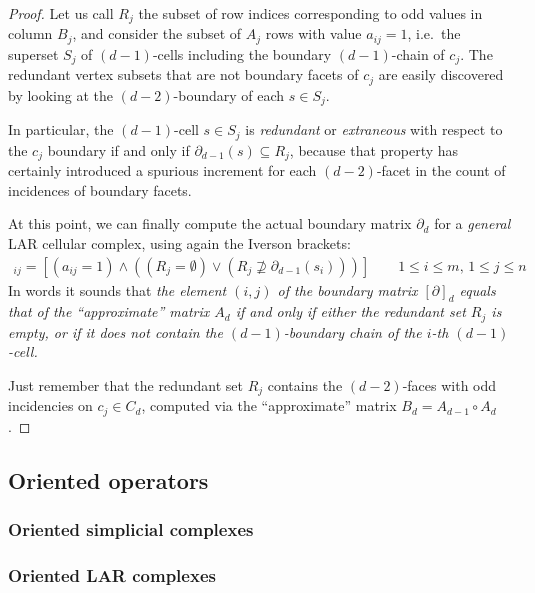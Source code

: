\documentclass[11pt,oneside]{article}    %
\begin{document}
\begin{proof}
Let us call $R_j$ the subset of row indices corresponding to odd values in column $B_j$, and consider the subset of $A_j$ rows with value $a_{ij}=1$, i.e.~the superset $S_j$ of $(d-1)$-cells including the boundary $(d-1)$-chain of $c_j$. The redundant vertex subsets that are not boundary facets of $c_j$  are easily discovered by looking at the $(d-2)$-boundary of each $s\in S_j$.

In particular, the $(d-1)$-cell $s\in S_j$ is \emph{redundant} or \emph{extraneous} with respect to the $c_j$ boundary if and only if $\partial_{d-1}(s) \subseteq R_j$, because that property has certainly introduced a spurious increment for each $(d-2)$-facet in the count of incidences of boundary facets.

At this point, we can finally compute the actual boundary matrix $\partial_d$ for a \emph{general} LAR cellular complex, using again the Iverson brackets:
\begin{align*}
[\partial_d]_{ij} = [(a_{ij}=1) \wedge ((R_j=\emptyset) \vee (R_j \not\supseteq \partial_{d-1}(s_i)))]\qquad 1\leq i\leq m,\, 1\leq j\leq n
\end{align*}
In words it sounds that \emph{the element $(i,j)$ of the boundary matrix $[\partial]_d$ equals that of the ``approximate'' matrix $A_d$ if and only if either the redundant set $R_j$ is empty, or if it does not contain the $(d-1)$-boundary chain of the $i$-th $(d-1)$-cell.}

Just remember that the redundant set $R_j$ contains the $(d-2)$-faces with odd incidencies on $c_j\in C_d$, computed via the ``approximate'' matrix $B_d = A_{d-1}\circ A_d$.

\end{proof}  


\subsection{Oriented operators}

\subsubsection{Oriented simplicial complexes}

\subsubsection{Oriented LAR complexes}
\end{document}

